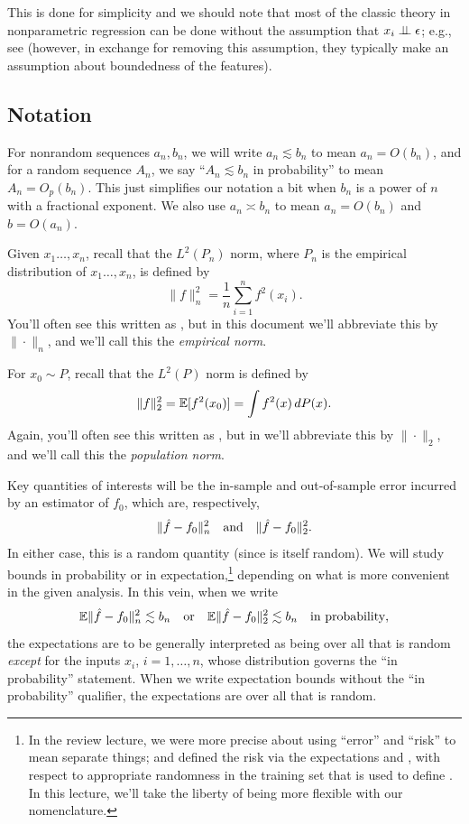 \documentclass{article}
\begin{document}
This is done for simplicity and we should note that most of the classic theory
in nonparametric regression can be done without the assumption that $x_i \perp\!\!\!\perp
\epsilon$; e.g., see \citet{gyorfi2002distribution} (however, in exchange for
removing this assumption, they typically make an assumption about boundedness of 
the features).     

\subsection{Notation}

For nonrandom sequences $a_n,b_n$, we will write $a_n \lesssim b_n$ to mean $a_n
= O(b_n)$, and for a random sequence $A_n$, we say ``$A_n \lesssim b_n$ in
probability'' to mean $A_n = O_p(b_n)$. This just simplifies our notation a bit
when $b_n$ is a power of $n$ with a fractional exponent. We also use $a_n \asymp 
b_n$ to mean $a_n = O(b_n)$ and $b = O(a_n)$. 

Given $x_1\dots,x_n$, recall that the $L^2(P_n)$ norm, where $P_n$ is the
empirical distribution of $x_1\dots,x_n$, is defined by 
\[
\|f\|_n^2 = \frac{1}{n} \sum_{i=1}^n f^2(x_i).
\]
You'll often see this written as , but in this
document we'll abbreviate this by $\|\cdot\|_n$, and we'll call this the 
\emph{empirical norm}.

For $x_0 \sim P$, recall that the $L^2(P)$ norm is defined by 
\[
\|f\|_2^2 = \mathbb{E}[f^2(x_0)] = \int f^2(x) \, dP(x). 
\]
Again, you'll often see this written as , but in
we'll abbreviate this by $\|\cdot\|_2$, and we'll call this the \emph{population
  norm}.    

Key quantities of interests will be the in-sample and out-of-sample error
incurred by an estimator \smash{$\hf$} of $f_0$, which are, respectively, 
\[
\|\hat{f} - f_0\|_n^2 \quad \text{and} \quad \|\hat{f} - f_0\|_2^2.
\]
In either case, this is a random quantity (since \smash{$\hf$} is itself
random). We will study bounds in probability or in expectation,\footnote{In the 
  review lecture, we were more precise about using ``error'' and ``risk'' to
  mean separate things; and defined the risk via the expectations 
   and , with respect  
  to appropriate randomness in the training set that is used to define
  \smash{$\hf$}. In this lecture, we'll take the liberty of being more flexible
  with our nomenclature.}     
depending on what is more convenient in the given analysis. In this vein, when
we write 
\[
\mathbb{E}\|\hat{f} - f_0\|_n^2 \lesssim b_n \quad \text{or} \quad \mathbb{E}\|\hat{f} - f_0\|_2^2
\lesssim b_n \quad \text{in probability},
\]
the expectations are to be generally interpreted as being over all that is
random \emph{except} for the inputs $x_i$, $i=1,\dots,n$, whose distribution
governs the ``in probability'' statement. When we write expectation bounds
without the ``in probability'' qualifier, the expectations are over all that is
random.
\end{document}
